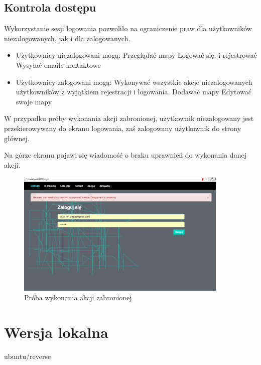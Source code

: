 \subsection{Kontrola dostępu}

Wykorzystanie sesji logowania pozwoliło na ograniczenie praw dla użytkowników niezalogowanych, jak i dla zalogowanych.

\begin{itemize}
\item Użytkownicy niezalogowani mogą:
	\subitem Przeglądać mapy
	\subitem Logować się, i rejestrować
	\subitem Wysyłać emaile kontaktowe
			
\item Użytkownicy zalogowani mogą:
	\subitem Wykonywać wszystkie akcje niezalogowanych użytkowników z wyjątkiem rejestracji i logowania.
	\subitem Dodawać mapy
	\subitem Edytować swoje mapy
\end{itemize}

W przypadku próby wykonania akcji zabronionej, użytkownik niezalogowany jest przekierowywany do ekranu logowania, zaś zalogowany użytkownik do strony głównej.

Na górze ekranu pojawi się wiadomość o braku uprawnień do wykonania danej akcji.

\FloatBarrier
 	\begin{figure}[ht]
        \centering
        \includegraphics[width=0.90\textwidth,height=0.46\textheight]{img/no_access.png}
	\caption{Próba wykonania akcji zabronionej}
        \label{rys:screen_no_access}
    \end{figure}
\FloatBarrier


\section{Wersja lokalna}

ubuntu/reverse
